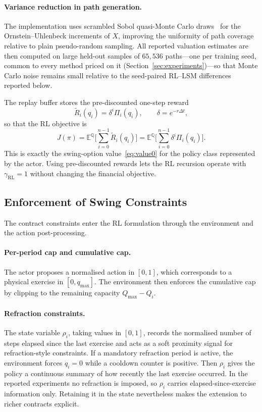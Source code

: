 \documentclass[a4paper,fleqn]{cas-dc}
\begin{document}
\paragraph{Variance reduction in path generation.}
The implementation uses scrambled Sobol quasi-Monte Carlo draws~\cite{owen1995scrambled} for the Ornstein--Uhlenbeck increments of $X$, improving the uniformity of path coverage relative to plain pseudo-random sampling. All reported valuation estimates are then computed on large held-out samples of $65{,}536$ paths---one per training seed, common to every method priced on it (Section~\ref{sec:experiments})---so that Monte Carlo noise remains small relative to the seed-paired RL--LSM differences reported below.

The replay buffer stores the pre-discounted one-step reward
\[
    \tilde R_i(q_i) = \delta^i \Pi_i(q_i),
    \qquad
    \delta = e^{-r\Delta t},
\]
so that the RL objective is
\[
    J(\pi) =
    \mathbb{E}^{\mathbb{Q}}
    \biggl[
        \sum_{i=0}^{n-1} \tilde R_i(q_i)
        \biggr]
    =
    \mathbb{E}^{\mathbb{Q}}
    \biggl[
        \sum_{i=0}^{n-1} \delta^i \Pi_i(q_i)
        \biggr].
\]
This is exactly the swing-option value~\eqref{eq:value0} for the policy class represented by the actor. Using pre-discounted rewards lets the RL recursion operate with $\gamma_{\mathrm{RL}} = 1$ without changing the financial objective.

\subsection{Enforcement of Swing Constraints}

The contract constraints enter the RL formulation through the environment and the action post-processing.

\paragraph{Per-period cap and cumulative cap.}
The actor proposes a normalised action in $[0,1]$, which corresponds to a physical exercise in $[0,q_{\max}]$. The environment then enforces the cumulative cap by clipping to the remaining capacity $Q_{\max} - Q_i$.

\paragraph{Refraction constraints.}
The state variable $\rho_i$, taking values in $[0,1]$, records the normalised number of steps elapsed since the last exercise and acts as a soft proximity signal for refraction-style constraints. If a mandatory refraction period is active, the environment forces $q_i = 0$ while a cooldown counter is positive. Then $\rho_i$ gives the policy a continuous summary of how recently the last exercise occurred. In the reported experiments no refraction is imposed, so $\rho_i$ carries elapsed-since-exercise information only. Retaining it in the state nevertheless makes the extension to richer contracts explicit.
\end{document}
